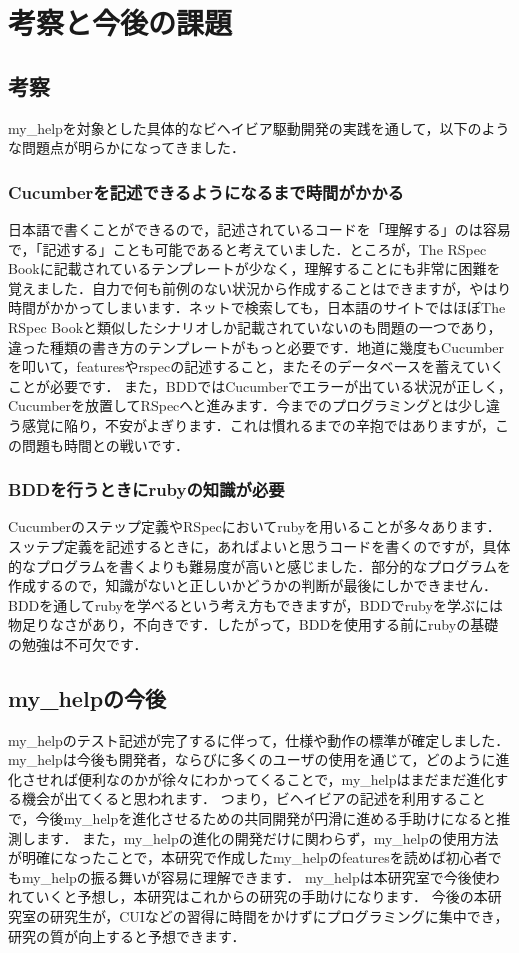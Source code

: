 \section{考察と今後の課題}
\subsection{考察}
my\_helpを対象とした具体的なビヘイビア駆動開発の実践を通して，以下のような問題点が明らかになってきました．

\subsubsection{Cucumberを記述できるようになるまで時間がかかる}
日本語で書くことができるので，記述されているコードを「理解する」のは容易で，「記述する」ことも可能であると考えていました．ところが，The RSpec Book\cite{RSpecBook}に記載されているテンプレートが少なく，理解することにも非常に困難を覚えました．自力で何も前例のない状況から作成することはできますが，やはり時間がかかってしまいます．ネットで検索しても，日本語のサイトではほぼThe RSpec Book\cite{RSpecBook}と類似したシナリオしか記載されていないのも問題の一つであり，違った種類の書き方のテンプレートがもっと必要です．地道に幾度もCucumberを叩いて，featuresやrspecの記述すること，またそのデータベースを蓄えていくことが必要です．
また，BDDではCucumberでエラーが出ている状況が正しく，Cucumberを放置してRSpecへと進みます．今までのプログラミングとは少し違う感覚に陥り，不安がよぎります．これは慣れるまでの辛抱ではありますが，この問題も時間との戦いです．

\subsubsection{BDDを行うときにrubyの知識が必要}
Cucumberのステップ定義やRSpecにおいてrubyを用いることが多々あります．スッテプ定義を記述するときに，あればよいと思うコードを書くのですが，具体的なプログラムを書くよりも難易度が高いと感じました．部分的なプログラムを作成するので，知識がないと正しいかどうかの判断が最後にしかできません．BDDを通してrubyを学べるという考え方もできますが，BDDでrubyを学ぶには物足りなさがあり，不向きです．したがって，BDDを使用する前にrubyの基礎の勉強は不可欠です．

\subsection{my\_helpの今後}
my\_helpのテスト記述が完了するに伴って，仕様や動作の標準が確定しました．
my\_helpは今後も開発者，ならびに多くのユーザの使用を通じて，どのように進化させれば便利なのかが徐々にわかってくることで，my\_helpはまだまだ進化する機会が出てくると思われます．
つまり，ビヘイビアの記述を利用することで，今後my\_helpを進化させるための共同開発が円滑に進める手助けになると推測します．
また，my\_helpの進化の開発だけに関わらず，my\_helpの使用方法が明確になったことで，本研究で作成したmy\_helpのfeaturesを読めば初心者でもmy\_helpの振る舞いが容易に理解できます．
my\_helpは本研究室で今後使われていくと予想し，本研究はこれからの研究の手助けになります．
今後の本研究室の研究生が，CUIなどの習得に時間をかけずにプログラミングに集中でき，研究の質が向上すると予想できます．

